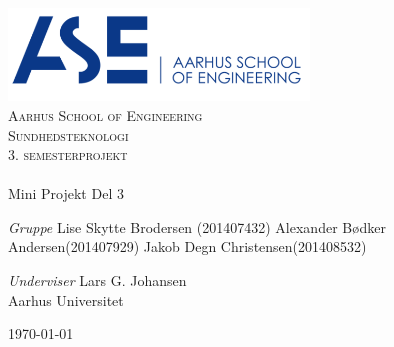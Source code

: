\begin{titlingpage}
\begin{center}

~ \\[3cm]


\includegraphics[width=0.6\textwidth]{Figur/ASE}\\[1cm]

\textsc{\LARGE Aarhus School of Engineering}\\[1.5cm]

\textsc{\Large Sundhedsteknologi}\\
\textsc{\Large 3. semesterprojekt}\\[0.5cm]

\noindent\makebox[\linewidth]{\rule{\textwidth}{0.4pt}}\\
[0.5cm]{\Huge Mini Projekt Del 3}
\noindent\makebox[\linewidth]{\rule{\textwidth}{0.4pt}}

\end{center}

\textit{Gruppe} \newline
Lise Skytte Brodersen (201407432) \newline
Alexander Bødker Andersen(201407929) \newline
Jakob Degn Christensen(201408532) \newline




\textit{Underviser} \newline
Lars G. Johansen\\
Aarhus Universitet


\vfill

\begin{center}
{\large \today}
\end{center}


\end{titlingpage}